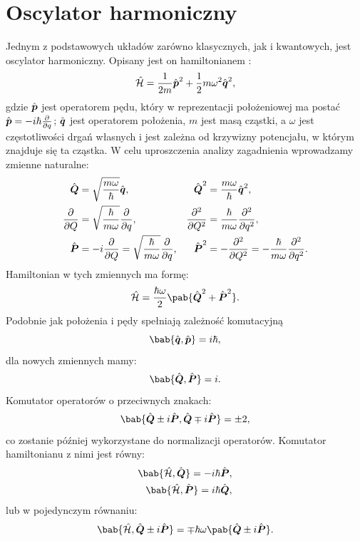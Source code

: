 
\section{Oscylator harmoniczny}\label{sec:osc_harm}
Jednym z podstawowych układów zarówno klasycznych, jak i kwantowych, jest oscylator harmoniczny. Opisany jest on hamiltonianem \cite{Louisell}:
\begin{equation*}
	\ham = \inv{2m} \vu{p}^2 + \inv{2} m \omega^2 \vu{q}^2,
\end{equation*}
gdzie \(\vu{p}\) jest operatorem pędu, który w reprezentacji położeniowej ma postać \(\vu{p} = - i \hbar \pdv{}{q}\); \(\vu{q}\) jest operatorem położenia, \(m\) jest masą cząstki, a \(\omega\) jest częstotliwości drgań własnych i jest zależna od krzywizny potencjału, w którym znajduje się ta cząstka. W celu uproszczenia analizy zagadnienia wprowadzamy zmienne naturalne:
\begin{align*}
	\vu{Q} &= \sqrt{\frac{m\omega}{\hbar}} \vu{q}, &
	\vu{Q}^2 &= \frac{m\omega}{\hbar} \vu{q}^2, \\
	\pdv{}{Q} &= \sqrt{\frac{\hbar}{m\omega}} \pdv{}{q}, &
	\pdv[order=2]{}{Q} &= \frac{\hbar}{m\omega} \pdv[order=2]{}{q}, \\
	\vu{P} &= - i \pdv{}{Q} = \sqrt{\frac{\hbar}{m\omega}} \pdv{}{q}, &
	\vu{P}^2 &= - \pdv[order=2]{}{Q} = - \frac{\hbar}{m\omega} \pdv[order=2]{}{q}.
\end{align*}
Hamiltonian w tych zmiennych ma formę:
\begin{equation*}
	\ham = \frac{\hbar\omega}{2}\pab{\vu{Q}^2 + \vu{P}^2}.
\end{equation*}
Podobnie jak położenia i pędy spełniają zależność komutacyjną
\begin{equation*}
	\bab{\vu{q},\vu{p}} = i\hbar,
\end{equation*}
dla nowych zmiennych mamy:
\begin{equation*}
	\bab{\vu{Q},\vu{P}} = i.
\end{equation*}
Komutator operatorów o przeciwnych znakach:
\begin{equation*}
	\bab{\vu{Q} \pm i\vu{P}, \vu{Q} \mp i\vu{P}} = \pm 2,
\end{equation*}
co zostanie później wykorzystane do normalizacji operatorów.
Komutator hamiltonianu z nimi jest równy:
\begin{align*}
	\bab{\ham,\vu{Q}} = - i\hbar \vu{P}, \\
	\bab{\ham,\vu{P}} =   i\hbar \vu{Q},
\end{align*}
lub w pojedynczym równaniu:
\begin{equation*}
	\bab{\ham,\vu{Q} \pm i\vu{P}} = \mp \hbar\omega \pab{\vu{Q} \pm i\vu{P}}.
\end{equation*}

